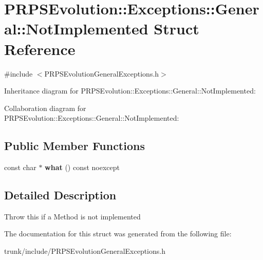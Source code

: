 \hypertarget{struct_p_r_p_s_evolution_1_1_exceptions_1_1_general_1_1_not_implemented}{\section{P\-R\-P\-S\-Evolution\-:\-:Exceptions\-:\-:General\-:\-:Not\-Implemented Struct Reference}
\label{struct_p_r_p_s_evolution_1_1_exceptions_1_1_general_1_1_not_implemented}
}


{\ttfamily \#include $<$P\-R\-P\-S\-Evolution\-General\-Exceptions.\-h$>$}



Inheritance diagram for P\-R\-P\-S\-Evolution\-:\-:Exceptions\-:\-:General\-:\-:Not\-Implemented\-:


Collaboration diagram for P\-R\-P\-S\-Evolution\-:\-:Exceptions\-:\-:General\-:\-:Not\-Implemented\-:
\subsection*{Public Member Functions}
\begin{DoxyCompactItemize}
\item 
\hypertarget{struct_p_r_p_s_evolution_1_1_exceptions_1_1_general_1_1_not_implemented_aca39e537c0bbad06a4f70aa75a8133ef}{const char $\ast$ {\bfseries what} () const noexcept}\label{struct_p_r_p_s_evolution_1_1_exceptions_1_1_general_1_1_not_implemented_aca39e537c0bbad06a4f70aa75a8133ef}

\end{DoxyCompactItemize}


\subsection{Detailed Description}
Throw this if a Method is not implemented 

The documentation for this struct was generated from the following file\-:\begin{DoxyCompactItemize}
\item 
trunk/include/P\-R\-P\-S\-Evolution\-General\-Exceptions.\-h\end{DoxyCompactItemize}
